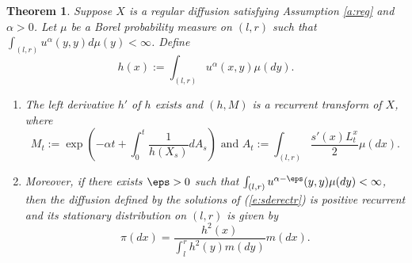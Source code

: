 \documentclass[11pt,reqno]{amsart}
\numberwithin{equation}{section}
\newtheorem{theorem}{Theorem}[section]
\begin{document}
\begin{theorem} \label{t:prctr}
	 Suppose $X$ is a regular  diffusion satisfying Assumption \ref{a:reg} and $\alpha>0$. Let $\mu$ be a Borel probability measure on $(l,r)$ such that $\int_{(l,r)} u^{\alpha}(y,y)d\mu(y)<\infty$. Define 
	 \[
	 h(x):=\int_{(l,r)}u^{\alpha}(x,y)\mu(dy).
	 \]
	 \begin{enumerate}
	 	\item The left derivative $h'$ of $h$ exists and $(h,M)$ is a recurrent transform of $X$, where
	 	\[
	 	M_t :=\exp\left(-\alpha t+\int_0^t\frac{1}{h(X_s)}dA_s\right) \mbox{ and } A_t:= \int_{(l,r)} \frac{s'(x)L^x_t}{2}\mu(dx).
	 	\]
	 	\item Moreover, if there exists $\eps >0$ such that $\int_{(l,r)} u^{\alpha-\eps}(y,y)\mu(dy)<\infty$, then the diffusion defined by the  solutions of (\ref{e:sderectr}) is positive recurrent and its stationary distribution on $(l,r)$ is given by 
	 	\[
	 	\pi(dx)=\frac{h^2(x)}{\int_l^r h^2(y)m(dy)}m(dx).
	 	\]
	 \end{enumerate} 
\end{theorem}
\end{document}
